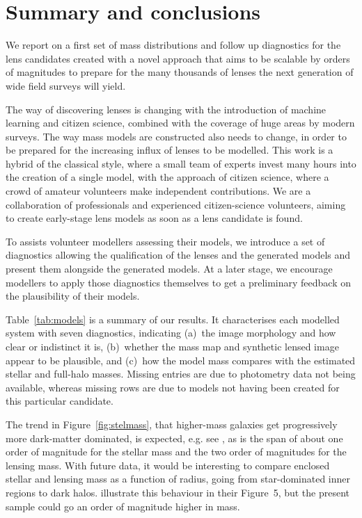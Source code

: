 \section{Summary and conclusions}\label{sec:summary}


We report on a first set of mass distributions and follow up diagnostics for 
the {\SW} lens candidates created with a novel approach that aims to be scalable 
by orders of magnitudes to prepare for the many thousands of lenses the next 
generation of wide field surveys will yield.

The way of discovering lenses is changing with the introduction of
machine learning and citizen science, combined with the coverage of
huge areas by modern surveys.  The way mass models are constructed also needs to
change, in order to be prepared for the increasing influx of lenses to
be modelled.  This work is a hybrid of the classical style, where a
small team of experts invest many hours into the creation of a single
model, with the approach of citizen science, where a crowd of amateur
volunteers make independent contributions.  We are a collaboration of
professionals and experienced citizen-science volunteers, aiming to
create early-stage lens models as soon as a lens candidate is found.

To assists volunteer modellers assessing their models, we introduce a
set of diagnostics allowing the qualification of the lenses and the
generated models and present them alongside the generated models. At a
later stage, we encourage modellers to apply those diagnostics
themselves to get a preliminary feedback on the plausibility of their
models.

Table~\ref{tab:models} is a summary of our results.  It characterises
each modelled system with seven diagnostics, indicating (a)~the image
morphology and how clear or indistinct it is, (b)~whether the mass map
and synthetic lensed image appear to be plausible, and (c)~how the
model mass compares with the estimated stellar and full-halo masses.
Missing entries are due to photometry data not being available, whereas
missing rows are due to models not having been created for this particular
candidate.



The trend in Figure~\ref{fig:stelmass}, that higher-mass galaxies get 
progressively more dark-matter dominated, is expected, e.g. see 
\cite{2005ApJ...623L...5F}, as is the span of about one order of magnitude for 
the stellar mass and the two order of magnitudes for the lensing mass. With 
future data, it would be interesting to compare enclosed stellar and lensing 
mass as a function of radius, going from star-dominated inner regions to dark 
halos. \cite{2011ApJ...740...97L} illustrate this behaviour in their Figure~5, 
but the present sample could go an order of magnitude higher in mass.

